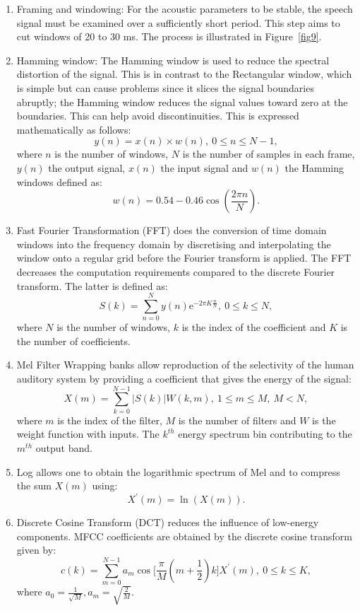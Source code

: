 \begin{enumerate}
    \item Framing and windowing: For the acoustic parameters to be stable, the speech signal must be examined over a sufficiently short period. This step aims to cut windows of 20 to 30 ms. The process is illustrated in  Figure~\ref{fig9}.
    \item Hamming window: The Hamming window is used to reduce the spectral distortion of the signal. This is in contrast to the Rectangular window, which is simple but can cause problems since it slices the signal boundaries abruptly; the Hamming window reduces the signal values toward zero at the boundaries. This can help avoid discontinuities. This is expressed mathematically as follows: 
    \begin{equation}
        y(n)=x(n)\times w(n),~0\leq n\leq N-1,
    \end{equation}
    where $n$ is the number of windows, $N$ is the number of samples in each frame, $y(n)$ the output signal, $x(n)$ the input signal and $w(n)$ the Hamming windows defined as:
    \begin{equation}
        w(n) = 0.54 -0.46\cos\left(\frac{2 \pi n}{N} \right).
    \end{equation}
    \item	Fast Fourier Transformation (FFT) does the conversion of time domain windows into the frequency domain by discretising and interpolating the window onto a regular grid before the Fourier transform is applied. The FFT decreases the computation requirements compared to the discrete Fourier transform. The latter is defined as: 
\begin{equation}
    S(k)=\sum_{n=0}^{N}y(n)\text{e}^{-2\pi K\frac{n}{N}},~0\leq k\leq N,
\end{equation}
where $N$ is the number of windows, $k$ is the index of the coefficient and $K$ is the number of coefficients. 
\item	Mel Filter Wrapping banks allow reproduction of the selectivity of the human auditory system by providing a coefficient that gives the energy of the signal: 
\begin{equation}
    X(m)=\sum_{k=0}^{N-1}|S(k)|W(k,m),~1\leq m \leq M, ~M<N,
\end{equation}
where $m$ is the index of the filter, $M$ is the number of filters and $W$ is the weight function with inputs. The $k^{th}$ energy spectrum bin contributing to the $m^{th}$ output band.
\item Log allows one to obtain the logarithmic spectrum of Mel and to compress the sum $X(m)$ using:
\begin{equation}
    X^\prime(m)=\ln(X(m)).
\end{equation}
\item	Discrete Cosine Transform (DCT) reduces the influence of low-energy components. MFCC coefficients are obtained by the discrete cosine transform given by:
\begin{equation}
    c(k)=\sum_{m=0}^{N-1}a_m \cos\bigg[\frac{\pi}{M}(m+\frac{1}{2})k\bigg]X^\prime(m),~0\leq k\leq K,
\end{equation}
 where $a_0=\frac{1}{\sqrt{M}}, a_m=\sqrt{\frac{2}{M}}$.
\end{enumerate}
